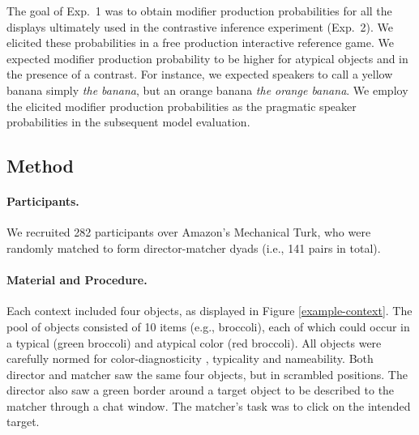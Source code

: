 \documentclass[10pt,letterpaper]{article}
\newcommand{\figref}[1]{Figure \ref{#1}}
\begin{document}
The goal of Exp.~1 was to obtain modifier production probabilities for all the displays ultimately used in the contrastive inference experiment (Exp.~2). We elicited these probabilities in a free production interactive reference game. We expected modifier production probability to be higher for atypical objects and in the presence of a contrast. For instance, we expected speakers to call a yellow banana simply \textit{the banana}, but an orange banana \textit{the orange banana}. We employ the elicited modifier production probabilities as the pragmatic speaker probabilities in the subsequent model evaluation.

\subsection{Method}

\paragraph{Participants.} We recruited 282 participants over Amazon's Mechanical Turk, who were randomly matched to form director-matcher dyads (i.e., 141 pairs in total).%




\paragraph{Material and Procedure.} Each context included four objects, as displayed in \figref{example-context}. The pool of objects consisted of 10 items (e.g., broccoli), each of which could occur in a typical (green broccoli) and atypical color (red broccoli). All objects were carefully normed for color-diagnosticity \cite{Tanaka:1999}, typicality and nameability. Both director and matcher saw the same four objects, but in scrambled positions. The director also saw a green border around a target object to be described to the matcher through a chat window. The matcher's task was to click on the intended target.
\end{document}
